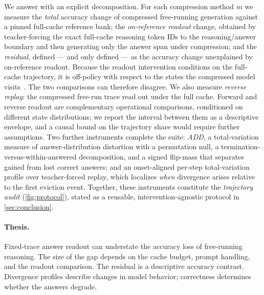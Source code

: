 \documentclass{article}
\begin{document}
We answer with an explicit decomposition. For each compression method $m$ we measure the \emph{total} accuracy change of compressed free-running generation against a pinned full-cache reference bank; the \emph{on-reference readout} change, obtained by teacher-forcing the exact full-cache reasoning token IDs to the reasoning/answer boundary and then generating only the answer span under compression; and the \emph{residual}, defined --- and only defined --- as the accuracy change unexplained by on-reference readout. Because the readout intervention conditions on the full-cache trajectory, it is off-policy with respect to the states the compressed model visits~\citep{ross2011dagger}. The two comparisons can therefore disagree. We also measure \emph{reverse replay}: the compressed free-run trace read out under the full cache. Forward and reverse readout are complementary operational comparisons, conditioned on different state distributions; we report the interval between them as a descriptive envelope, and a causal bound on the trajectory share would require further assumptions. Two further instruments complete the suite: \emph{ADD}, a total-variation measure of answer-distribution distortion with a permutation null, a termination-versus-within-answered decomposition, and a signed flip-mass that separates gained from lost correct answers; and an onset-aligned per-step total-variation profile over teacher-forced replay, which localizes \emph{when} divergence arises relative to the first eviction event. Together, these instruments constitute the \emph{trajectory audit} (\cref{fig:protocol}), stated as a reusable, intervention-agnostic protocol in \cref{sec:conclusion}.

\paragraph{Thesis.} Fixed-trace answer readout can understate the accuracy loss of free-running reasoning. The size of the gap depends on the cache budget, prompt handling, and the readout comparison. The residual is a descriptive accuracy contrast. Divergence profiles describe changes in model behavior; correctness determines whether the answers degrade.
\end{document}
